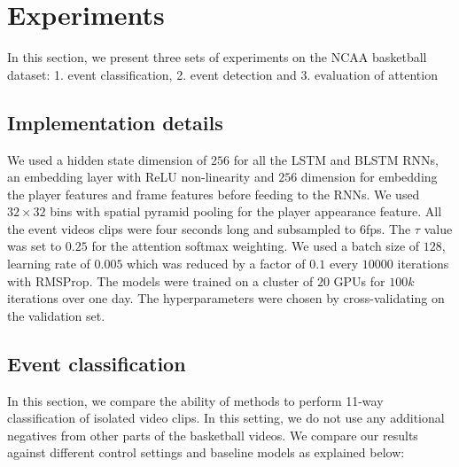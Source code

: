 
\section{Experiments}
\label{sec:experiments}

In this section, we present three sets of experiments on the NCAA basketball
dataset: 1. event classification, 2. event detection and 3. evaluation of
attention


\subsection{Implementation details}

 We used a hidden state dimension of $256$ for all the LSTM and
BLSTM RNNs, an embedding layer with ReLU non-linearity and $256$ dimension for
embedding the player features and frame features before feeding to the RNNs.
We used $32 \times 32$ bins with spatial pyramid pooling for the player appearance
feature.
All the event videos clips were four seconds long and subsampled to 6fps.  The
$\tau$ value was set to $0.25$ for the attention softmax weighting. We used a
batch size of $128$, learning rate of $0.005$ which was reduced by a factor of
$0.1$ every $10000$ iterations with RMSProp\cite{RMSProp}. The models were trained on
a cluster of $20$ GPUs for $100k$ iterations over one day.
The hyperparameters were chosen by cross-validating on the
validation set.

\subsection{Event classification}

In this section, we compare the ability of methods to perform 11-way classification of isolated video clips.
In this setting, we do not use any
additional negatives from other parts of the basketball videos.
We compare our results
against different control settings and baseline models as explained
below:


